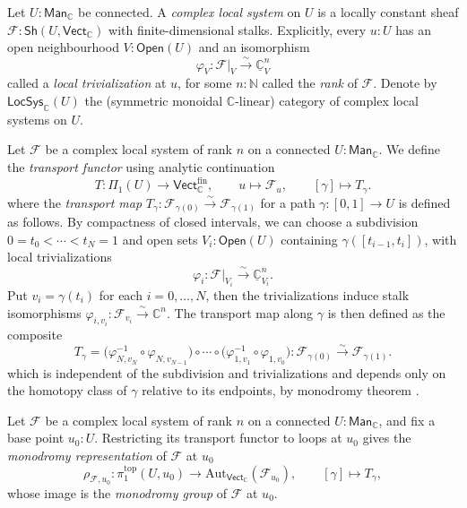 \documentclass[11pt,letterpaper]{article}
\theoremstyle{numberfirstplain}
\numberwithin{equation}{theorem}
\theoremstyle{numberfirstupright}
\begin{document}
\begin{definition}\label{def:complex-local-system}
Let $U:\mathsf{Man}_{\mathbb C}$ be connected. 
A \textit{complex local system} on $U$ is a locally constant sheaf $\mathcal F:\mathsf{Sh}(U,\mathsf{Vect}_{\mathbb C})$ with finite-dimensional stalks. 
Explicitly, every $u:U$ has an open neighbourhood $V:\mathsf{Open}(U)$ and an isomorphism
\[
\varphi_V:\mathcal F|_V\xrightarrow{\sim}\underline{\mathbb C}_V^n
\]
called a \textit{local trivialization} at $u$, for some $n:\mathbb N$ called the \textit{rank} of $\mathcal F$. 
Denote by $\mathsf{LocSys}_{\mathbb C}(U)$ the (symmetric monoidal $\mathbb C$-linear) category of complex local systems on $U$. 
\end{definition}
\begin{definition}[Transport]\label{def:complex-transport}
Let $\mathcal F$ be a complex local system of rank $n$ on a connected $U:\mathsf{Man}_{\mathbb C}$. We define the \textit{transport functor} using analytic continuation
\[
T:\Pi_1(U)\rightarrow\mathsf{Vect}_{\mathbb C}^{\mathrm{fin}},\qquad u\mapsto\mathcal F_u,\qquad [\gamma]\mapsto T_\gamma.
\]
where the \textit{transport map} $T_{\gamma}:\mathcal F_{\gamma(0)}\xrightarrow{\sim}\mathcal F_{\gamma(1)}$ for a path $\gamma:[0,1]\to U$ is defined as follows. 
By compactness of closed intervals, we can choose a subdivision $0=t_0<\cdots<t_N=1$ and open sets $V_i:\mathsf{Open}(U)$ containing $\gamma([t_{i-1},t_i])$, with local trivializations
\[
\varphi_i:\mathcal F|_{V_i}\xrightarrow{\sim}\underline{\mathbb C}_{V_i}^n.
\]
Put $v_i=\gamma(t_i)$ for each $i=0,\dots,N$, then the trivializations induce stalk isomorphisms $\varphi_{i,v_i}:\mathcal F_{v_i}\xrightarrow{\sim}\mathbb C^n$. 
The transport map along $\gamma$ is then defined as the composite
\[
T_\gamma=\bigl(\varphi_{N,v_N}^{-1}\circ\varphi_{N,v_{N-1}}\bigr)\circ\cdots\circ\bigl(\varphi_{1,v_1}^{-1}\circ\varphi_{1,v_0}\bigr):\mathcal F_{\gamma(0)}\xrightarrow{\sim}\mathcal F_{\gamma(1)}.
\]
which is independent of the subdivision and trivializations and depends only on the homotopy class of $\gamma$ relative to its endpoints, by monodromy theorem \cite[Lemma~7.2.7]{Schapira2011AlgebraTopology}.
\end{definition}

\begin{definition}[Monodromy]\label{def:monodromy}
Let $\mathcal F$ be a complex local system of rank $n$ on a connected $U:\mathsf{Man}_{\mathbb C}$, and fix a base point $u_0:U$. Restricting its transport functor to loops at $u_0$ gives the \textit{monodromy representation} of $\mathcal F$ at $u_0$
$$\rho_{\mathcal F,u_0}:\pi_1^{\mathrm{top}}(U,u_0)\rightarrow\mathrm{Aut}_{\mathsf{Vect}_{\mathbb C}}(\mathcal F_{u_0}),\qquad [\gamma]\mapsto T_\gamma,$$
whose image is the \textit{monodromy group} of $\mathcal F$ at $u_0$.
\end{definition}
\end{document}
